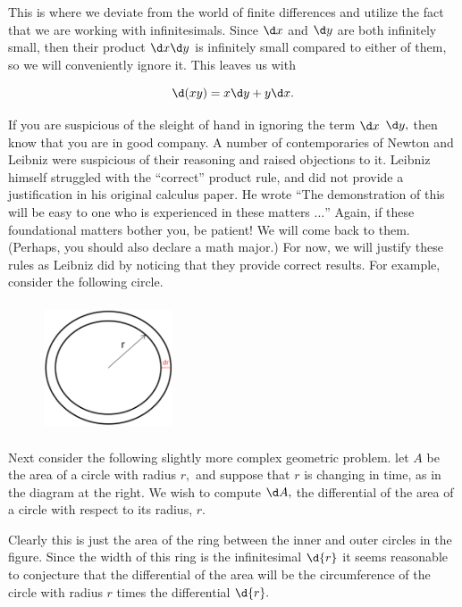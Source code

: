 This is where we deviate from the world of finite differences and
utilize the fact that we are working with infinitesimals.  Since $\d x$
and $\d y$ are both infinitely small, then their product $\d x\d y$ is
infinitely small compared to either of them, so we will conveniently
ignore it.  This leaves us with

$$
\d (xy)=x \d y+y \d x.
$$

If you are suspicious of the sleight of hand in ignoring the term $\d x$ 
$\d y,$ then know that you are in good company.  A number of
contemporaries of Newton and Leibniz were suspicious of their
reasoning and raised objections to it.  Leibniz himself struggled with
the ``correct'' product rule, and did not provide a justification in his
original calculus paper.  He wrote ``The demonstration of this will be
easy to one who is experienced in these matters $\ldots$'' Again, if these
foundational matters bother you, be patient! We will come back to
them.  (Perhaps, you should also declare a math major.)  For now, we
will justify these rules as Leibniz did by noticing that they provide
correct results.  For example, consider the following circle.

\begin{figure}
\captionsetup{labelformat=empty}
\centerline{\includegraphics*[height=1.5in,width=1.5in]{Figures/CircleDifferential}}
\label{fig:CircleDifferential}
\end{figure}
Next consider the following slightly more complex geometric
problem. let $A$ be the area of a circle with radius $r,$ and suppose
that $r$ is changing in time, as in the diagram at the right.  We wish
to compute $\d A,$ the differential of the area of a circle with
respect to its radius, $r.$

Clearly this is just the area of the ring
between the inner and outer circles in the figure.  Since the width of
this ring is the infinitesimal $\d{r}$ it seems reasonable to
conjecture that the differential of the area will be the circumference
of the circle with radius $r$ times the differential $\d{r}.$ 

